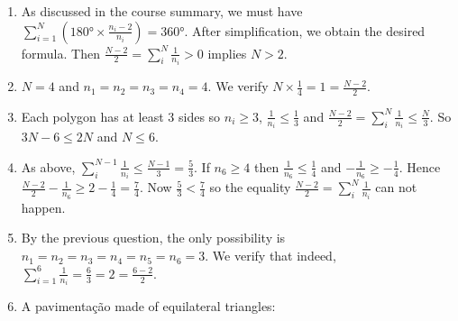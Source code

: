 \begin{enumerate}
\item As discussed in the course summary, we must have
  $\sum_{i=1}^N (180° \times \frac{n_i-2}{n_i}) = 360°$. After simplification,
  we obtain the desired formula.
  Then $\frac{N-2}{2} = \sum_{i}^N \frac{1}{n_i} > 0$ implies
  $N > 2$.
\item $N=4$ and $n_1=n_2=n_3=n_4=4$. We verify
  $N \times \frac{1}{4} = 1 = \frac{N-2}{2}$.
\item Each polygon has at least 3 sides so $n_i \geq 3$,
  $\frac{1}{n_i} \leq \frac{1}{3}$ and
  $\frac{N-2}{2} = \sum_{i}^N \frac{1}{n_i} \leq \frac{N}{3}$.
  So $3N - 6 \leq 2N$ and $N \leq 6$.
\item As above, $\sum_{i}^{N-1} \frac{1}{n_i} \leq \frac{N-1}{3} = \frac{5}{3}$.
  If $n_6 \geq 4$ then $\frac{1}{n_6} \leq \frac{1}{4}$ and
  $-\frac{1}{n_6} \geq -\frac{1}{4}$.
  Hence $\frac{N-2}{2} -\frac{1}{n_6} \geq 2 - \frac{1}{4} = \frac{7}{4}$.
  Now $\frac{5}{3} < \frac{7}{4}$ so the equality
  $\frac{N-2}{2} = \sum_{i}^N \frac{1}{n_i}$ can not happen.
\item By the previous question, the only possibility is
  $n_1=n_2=n_3=n_4=n_5=n_6=3$. We verify that indeed,
  $\sum_{i=1}^6 \frac{1}{n_i} = \frac{6}{3} = 2 = \frac{6-2}{2}$.
\item A pavimentação made of equilateral triangles:


\end{enumerate}
